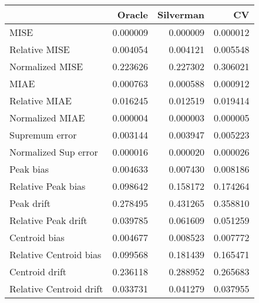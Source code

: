 \begin{tabular}{lrrr}
  \toprule
 & Oracle & Silverman & CV \\ 
  \midrule
MISE & 0.000009 & 0.000009 & 0.000012 \\ 
  Relative MISE & 0.004054 & 0.004121 & 0.005548 \\ 
  Normalized MISE & 0.223626 & 0.227302 & 0.306021 \\ 
  MIAE & 0.000763 & 0.000588 & 0.000912 \\ 
  Relative MIAE & 0.016245 & 0.012519 & 0.019414 \\ 
  Normalized MIAE & 0.000004 & 0.000003 & 0.000005 \\ 
  Supremum error & 0.003144 & 0.003947 & 0.005223 \\ 
  Normalized Sup error & 0.000016 & 0.000020 & 0.000026 \\ 
  Peak bias & 0.004633 & 0.007430 & 0.008186 \\ 
  Relative Peak bias & 0.098642 & 0.158172 & 0.174264 \\ 
  Peak drift & 0.278495 & 0.431265 & 0.358810 \\ 
  Relative Peak drift & 0.039785 & 0.061609 & 0.051259 \\ 
  Centroid bias & 0.004677 & 0.008523 & 0.007772 \\ 
  Relative Centroid bias & 0.099568 & 0.181439 & 0.165471 \\ 
  Centroid drift & 0.236118 & 0.288952 & 0.265683 \\ 
  Relative Centroid drift & 0.033731 & 0.041279 & 0.037955 \\ 
   \bottomrule
\end{tabular}
